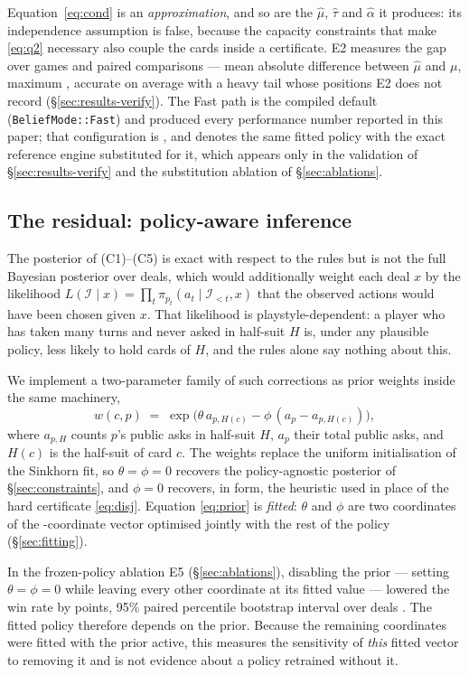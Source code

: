 Equation~\eqref{eq:cond} is an \emph{approximation}, and so are the $\hat\mu$,
$\hat\tau$ and $\hat\alpha$ it produces: its independence assumption is false,
because the capacity constraints that make \eqref{eq:q2} necessary also couple
the cards inside a certificate. E2 measures the gap over \numSelftestGames{}
games and \numSelftestChecks{} paired comparisons --- mean absolute difference
\numSinkhornMean{} between $\hat\mu$ and $\mu$, maximum \numSinkhornMax{},
accurate on average with a heavy tail whose positions E2 does not record
(\S\ref{sec:results-verify}). The Fast path is the compiled default
(\texttt{BeliefMode::Fast}) and produced every performance number reported in
this paper; that configuration is \vfast{}, and \vblock{} denotes the same
fitted policy with the exact reference engine substituted for it, which
appears only in the validation of \S\ref{sec:results-verify} and the
substitution ablation of \S\ref{sec:ablations}.

\subsection{The residual: policy-aware inference}
\label{sec:policyprior}

The posterior of (C1)--(C5) is exact with respect to the rules but is not the
full Bayesian posterior over deals, which would additionally weight each deal
$x$ by the likelihood $L(\mathcal{I} \mid x) = \prod_t \pi_{p_t}(a_t \mid
\mathcal{I}_{<t}, x)$ that the observed actions would have been chosen given
$x$. That likelihood is playstyle-dependent: a player who has taken many turns
and never asked in half-suit $H$ is, under any plausible policy, less likely
to hold cards of $H$, and the rules alone say nothing about this.

We implement a two-parameter family of such corrections as prior weights inside
the same machinery,
\begin{equation}
  w(c,p) \;=\; \exp\!\bigl(\theta\, a_{p,H(c)} - \phi\,(a_p - a_{p,H(c)})\bigr),
  \label{eq:prior}
\end{equation}
where $a_{p,H}$ counts $p$'s public asks in half-suit $H$, $a_p$ their total
public asks, and $H(c)$ is the half-suit of card $c$. The weights replace the
uniform initialisation of the Sinkhorn fit, so $\theta = \phi = 0$ recovers
the policy-agnostic posterior of \S\ref{sec:constraints}, and $\phi = 0$
recovers, in form, the heuristic \vthree{} used in place of the hard
certificate \eqref{eq:disj}. Equation \eqref{eq:prior} is \emph{fitted}:
$\theta$ and $\phi$ are two coordinates of the \numParams-coordinate vector
optimised jointly with the rest of the policy (\S\ref{sec:fitting}).

In the frozen-policy ablation E5 (\S\ref{sec:ablations}), disabling the prior ---
setting $\theta = \phi = 0$ while leaving every other coordinate at its fitted
value --- lowered the win rate by \numAblPrior{} points, 95\% paired percentile
bootstrap interval over deals \numAblPriorCI{}. The fitted policy therefore
depends on the prior. Because the remaining coordinates were fitted with the
prior active, this measures the sensitivity of \emph{this} fitted vector to
removing it and is not evidence about a policy retrained without it.
